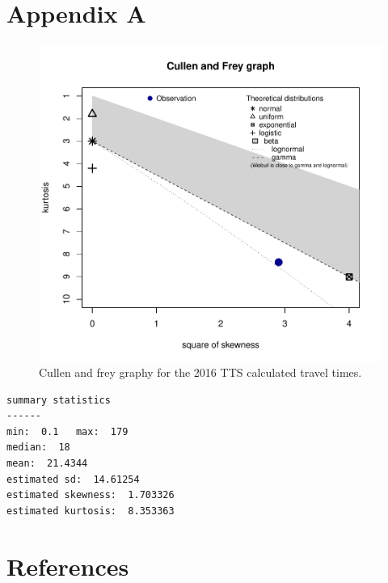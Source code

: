 \documentclass[]{elsarticle} %
\begin{document}
\newpage

\hypertarget{appendix-a}{%
\section{Appendix A}\label{appendix-a}}

\begin{figure}
\includegraphics[width=1\linewidth]{Spatial-Availability_files/figure-latex/plot-cullen-frey-1} \caption{\label{fig:plot-cullen-frey}Cullen and frey graphy for the 2016 TTS calculated travel times.}\label{fig:plot-cullen-frey}
\end{figure}

\begin{verbatim}
summary statistics
------
min:  0.1   max:  179 
median:  18 
mean:  21.4344 
estimated sd:  14.61254 
estimated skewness:  1.703326 
estimated kurtosis:  8.353363 
\end{verbatim}

\newpage

\hypertarget{references}{%
\section*{References}\label{references}}
\end{document}
